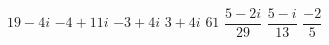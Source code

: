 \begin{Answer}\phantom{}
    \begin{multicols}{3}
	
		\Question $19-4i$
		\Question $-4+11i$
		\Question $-3+4i$
		\Question $3+4i$
		\Question $61$
		\Question $\dfrac{5-2i}{29}$
		\Question $\dfrac{5-i}{13}$
		\Question $\dfrac{-2}{5}$	
	\EndCurrentQuestion
	\end{multicols}
\end{Answer}

\fi 

